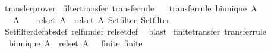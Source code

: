 \begin{isabellebody}
\ transfer{\isacharunderscore}{\kern0pt}prover%
\endisatagproof
{\isafoldproof}%
%
\isadelimproof
\isanewline
%
\endisadelimproof
\isanewline
{}\isamarkupfalse%
\ filter{\isacharunderscore}{\kern0pt}transfer\ {\isacharbrackleft}{\kern0pt}transfer{\isacharunderscore}{\kern0pt}rule{\isacharbrackright}{\kern0pt}{\isacharcolon}{\kern0pt}\isanewline
\ \ \ {\isacharbrackleft}{\kern0pt}transfer{\isacharunderscore}{\kern0pt}rule{\isacharbrackright}{\kern0pt}{\isacharcolon}{\kern0pt}\ {\isachardoublequoteopen}bi{\isacharunderscore}{\kern0pt}unique\ A{\isachardoublequoteclose}\isanewline
\ \ \ {\isachardoublequoteopen}{\isacharparenleft}{\kern0pt}{\isacharparenleft}{\kern0pt}A\ {\isacharequal}{\kern0pt}{\isacharequal}{\kern0pt}{\isacharequal}{\kern0pt}{\isachargreater}{\kern0pt}\ {\isacharparenleft}{\kern0pt}{\isacharequal}{\kern0pt}{\isacharparenright}{\kern0pt}{\isacharparenright}{\kern0pt}\ {\isacharequal}{\kern0pt}{\isacharequal}{\kern0pt}{\isacharequal}{\kern0pt}{\isachargreater}{\kern0pt}\ rel{\isacharunderscore}{\kern0pt}set\ A\ {\isacharequal}{\kern0pt}{\isacharequal}{\kern0pt}{\isacharequal}{\kern0pt}{\isachargreater}{\kern0pt}\ rel{\isacharunderscore}{\kern0pt}set\ A{\isacharparenright}{\kern0pt}\ Set{\isachardot}{\kern0pt}filter\ Set{\isachardot}{\kern0pt}filter{\isachardoublequoteclose}\isanewline
%
\isadelimproof
\ \ %
\endisadelimproof
%
\isatagproof
{}\isamarkupfalse%
\ Set{\isachardot}{\kern0pt}filter{\isacharunderscore}{\kern0pt}def{\isacharbrackleft}{\kern0pt}abs{\isacharunderscore}{\kern0pt}def{\isacharbrackright}{\kern0pt}\ rel{\isacharunderscore}{\kern0pt}fun{\isacharunderscore}{\kern0pt}def\ rel{\isacharunderscore}{\kern0pt}set{\isacharunderscore}{\kern0pt}def\ \isamarkupfalse%
\ blast%
\endisatagproof
{\isafoldproof}%
%
\isadelimproof
\isanewline
%
\endisadelimproof
\isanewline
{}\isamarkupfalse%
\ finite{\isacharunderscore}{\kern0pt}transfer\ {\isacharbrackleft}{\kern0pt}transfer{\isacharunderscore}{\kern0pt}rule{\isacharbrackright}{\kern0pt}{\isacharcolon}{\kern0pt}\isanewline
\ \ {\isachardoublequoteopen}bi{\isacharunderscore}{\kern0pt}unique\ A\ {\isasymLongrightarrow}\ {\isacharparenleft}{\kern0pt}rel{\isacharunderscore}{\kern0pt}set\ A\ {\isacharequal}{\kern0pt}{\isacharequal}{\kern0pt}{\isacharequal}{\kern0pt}{\isachargreater}{\kern0pt}\ {\isacharparenleft}{\kern0pt}{\isacharequal}{\kern0pt}{\isacharparenright}{\kern0pt}{\isacharparenright}{\kern0pt}\ finite\ finite{\isachardoublequoteclose}\isanewline
%
\isadelimproof
\ \ %
\endisadelimproof

\end{isabellebody}
